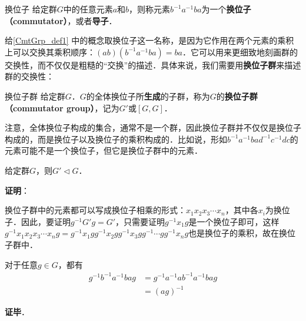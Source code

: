 


\begin{definition}{换位子}\label{CmtGrp_def1}
给定群$G$中的任意元素$a$和$b$，则称元素$b^{-1}a^{-1}ba$为一个\textbf{换位子（commutator）}，或者\textbf{导子}．
\end{definition}

给\autoref{CmtGrp_def1} 中的概念取换位子这一名称，是因为它作用在两个元素的乘积上可以交换其乘积顺序：$(ab)(b^{-1}a^{-1}ba)=ba$．它可以用来更细致地刻画群的交换性，而不仅仅是粗糙的“交换”的描述．具体来说，我们需要用\textbf{换位子群}来描述群的交换性：

\begin{definition}{换位子群}
给定群$G$．$G$的全体换位子所\textbf{生成}的子群，称为$G$的\textbf{换位子群（commutator group）}，记为$G'$或$[G, G]$．
\end{definition}

注意，全体换位子构成的集合，通常不是一个群，因此换位子群并不仅仅是换位子构成的，而是换位子以及换位子的乘积构成的．比如说，形如$b^{-1}a^{-1}bad^{-1}c^{-1}dc$的元素可能不是一个换位子，但它是换位子群中的元素．

\begin{theorem}{}
给定群$G$，则$G'\triangleleft G$．
\end{theorem}

\textbf{证明}：

换位子群中的元素都可以写成换位子相乘的形式：$x_1x_2x_3\cdots x_n$，其中各$x_i$为换位子．因此，要证明$g^{-1}G'g=G'$，只需要证明$g^{-1}x_1g$是一个换位子即可，这样$g^{-1}x_1x_2x_3\cdots x_ng=g^{-1}x_1gg^{-1}x_2gg^{-1}x_3gg^{-1}\cdots gg^{-1}x_ng$也是换位子的乘积，故在换位子群中．

对于任意$g\in G$，都有
\begin{equation}
\begin{aligned}
g^{-1}b^{-1}a^{-1}bag&=g^{-1}a^{-1}ab^{-1}a^{-1}bag\\
&=(ag)^{-1}
\end{aligned}
\end{equation}

\textbf{证毕}．














